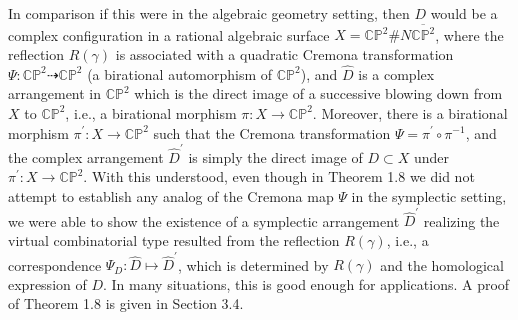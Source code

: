 \documentclass[11pt]{amsart}
\theoremstyle{plain}
\numberwithin{theorem}{section}
\theoremstyle{definition}
\newcommand{\C}{{\mathbb C}}
\renewcommand{\P}{{\mathbb P}}
\begin{document}
In comparison if this were in the algebraic geometry setting, then $D$ would be a complex configuration in a 
rational algebraic surface $X=\C\P^2 \# N \overline{\C\P^2}$, where the reflection $R(\gamma)$ is associated with 
a quadratic Cremona transformation $\Psi: \C\P^2\dashrightarrow \C\P^2$ (a birational automorphism of $\C\P^2$), and $\hat{D}$ is a complex arrangement in $\C\P^2$ which is the direct image of a successive blowing down from
$X$ to $\C\P^2$, i.e., a birational morphism $\pi: X\rightarrow \C\P^2$. Moreover, there is a birational
morphism $\pi^\prime: X\rightarrow \C\P^2$ such that the Cremona transformation 
$\Psi=\pi^\prime \circ \pi^{-1}$, and the complex arrangement 
$\hat{D}^\prime$ is simply the direct image of $D\subset X$ under $\pi^\prime: X\rightarrow \C\P^2$. With this 
understood, even though in Theorem 1.8 we did not attempt to establish any analog of the Cremona 
map $\Psi$ in the symplectic setting, we were able to show the existence of a symplectic arrangement 
$\hat{D}^\prime$ realizing the virtual combinatorial type resulted from the reflection $R(\gamma)$,
i.e., a correspondence $\Psi_D: \hat{D}\mapsto \hat{D}^\prime$, which is determined by $R(\gamma)$ and the homological expression of $D$. In many situations, this is good enough for applications. 
A proof of Theorem 1.8 is given in Section 3.4.
\end{document}
